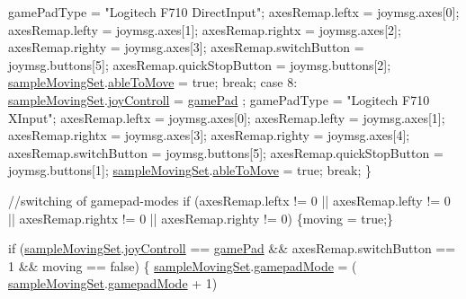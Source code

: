 \begin{DoxyCode}
                gamePadType = \textcolor{stringliteral}{"Logitech F710 DirectInput"};
                axesRemap.leftx = joymsg.axes[0];
                axesRemap.lefty = joymsg.axes[1];
                axesRemap.rightx = joymsg.axes[2];
                axesRemap.righty = joymsg.axes[3];
                axesRemap.switchButton = joymsg.buttons[5];
                axesRemap.quickStopButton = joymsg.buttons[2];
                \hyperlink{classSampleMoving_af9c7dc0be1c4197469fbfa7aa105f1cc}{sampleMovingSet}.\hyperlink{structSampleMoving_1_1sampleMovingSettingStruct_a14089eeff8e96683e056b50c6ae6a998}{ableToMove} = \textcolor{keyword}{true};
                \textcolor{keywordflow}{break};
        \textcolor{keywordflow}{case} 8: \hyperlink{classSampleMoving_af9c7dc0be1c4197469fbfa7aa105f1cc}{sampleMovingSet}.\hyperlink{structSampleMoving_1_1sampleMovingSettingStruct_abcbeb9363905012770950c4908a4e1aa}{joyControll} = \hyperlink{classSampleMoving_ad495d48e1ec2093a36601548bfad852dafd942ead788c486efb6c26363e68acff}{gamePad}
      ;
                gamePadType = \textcolor{stringliteral}{"Logitech F710 XInput"};
                axesRemap.leftx = joymsg.axes[0];
                axesRemap.lefty = joymsg.axes[1];
                axesRemap.rightx = joymsg.axes[3];
                axesRemap.righty = joymsg.axes[4];
                axesRemap.switchButton = joymsg.buttons[5];
                axesRemap.quickStopButton = joymsg.buttons[1];
                \hyperlink{classSampleMoving_af9c7dc0be1c4197469fbfa7aa105f1cc}{sampleMovingSet}.\hyperlink{structSampleMoving_1_1sampleMovingSettingStruct_a14089eeff8e96683e056b50c6ae6a998}{ableToMove} = \textcolor{keyword}{true};
                \textcolor{keywordflow}{break};
    \}

    \textcolor{comment}{//switching of gamepad-modes}
    \textcolor{keywordflow}{if} (axesRemap.leftx != 0 || axesRemap.lefty != 0 || axesRemap.rightx != 0 
      || axesRemap.righty != 0) \{moving = \textcolor{keyword}{true};\}

    \textcolor{keywordflow}{if} (\hyperlink{classSampleMoving_af9c7dc0be1c4197469fbfa7aa105f1cc}{sampleMovingSet}.\hyperlink{structSampleMoving_1_1sampleMovingSettingStruct_abcbeb9363905012770950c4908a4e1aa}{joyControll} == \hyperlink{classSampleMoving_ad495d48e1ec2093a36601548bfad852dafd942ead788c486efb6c26363e68acff}{gamePad}
       && axesRemap.switchButton == 1  && moving == \textcolor{keyword}{false}) \{
        \hyperlink{classSampleMoving_af9c7dc0be1c4197469fbfa7aa105f1cc}{sampleMovingSet}.\hyperlink{structSampleMoving_1_1sampleMovingSettingStruct_a1b3cbdffd2c270871b009022b1f65eb0}{gamepadMode} = (\hyperlink{classSampleMoving_af9c7dc0be1c4197469fbfa7aa105f1cc}{
      sampleMovingSet}.\hyperlink{structSampleMoving_1_1sampleMovingSettingStruct_a1b3cbdffd2c270871b009022b1f65eb0}{gamepadMode} + 1) %


\end{DoxyCode}
